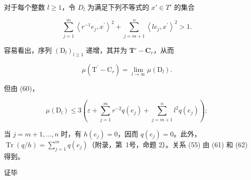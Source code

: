 对于每个整数 \(l \geqslant 1\)，令 \(D_l\) 为满足下列不等式的 \(x' \in T'\) 的集合

\[
\sum_ {j = 1} ^ {m} \left\langle r ^ {- 1} e _ {j}, x ^ {\prime} \right\rangle^ {2} + \sum_ {j = m + 1} ^ {n} \left\langle l e _ {j}, x ^ {\prime} \right\rangle^ {2} > 1.
\]

容易看出，序列 \((\mathrm{D}_l)_{l\geqslant 1}\) 递增，其并为 \(\mathbf{T}' - \mathbf{C}_r\)，从而

\[
\mu (\mathrm{T} ^ {\prime} - \mathrm{C} _ {r}) = \lim _ {l \to \infty} \mu (\mathrm{D} _ {l}).\tag{61}
\]

但由 (60)，

\[
\mu \left(\mathrm{D} _ {l}\right) \leqslant 3 \left(\varepsilon + \sum_ {j = 1} ^ {m} r ^ {- 2} q \left(e _ {j}\right) + \sum_ {j = m + 1} ^ {n} l ^ {2} q \left(e _ {j}\right)\right);\tag{62}
\]

当 \(j = m + 1, \ldots, n\) 时，有 \(h(e_j) = 0\)，因而 \(q(e_j) = 0\)。此外，\(\operatorname{Tr}(q/h) = \sum_{j=1}^{m} q(e_j)\)（附录，第~1号，命题 2）。关系 (55) 由 (61) 和 (62) 得到。

证毕

